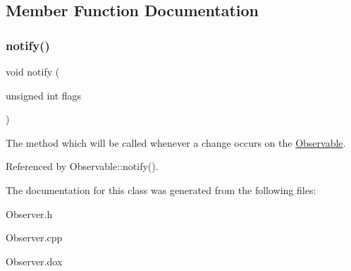\subsection{Member Function Documentation}
\mbox{\label{classKatabatic_1_1BaseObserver_a52e577fb0c4f2e3650928334fb621c2f}} 
\subsubsection{\texorpdfstring{notify()}{notify()}}
{\footnotesize\ttfamily void notify (\begin{DoxyParamCaption}\item[{unsigned int}]{flags }\end{DoxyParamCaption})\hspace{0.3cm}{\ttfamily [virtual]}}

The method which will be called whenever a change occurs on the \mbox{\hyperlink{classKatabatic_1_1Observable}{Observable}}. 

Referenced by Observable\+::notify().



The documentation for this class was generated from the following files\+:\begin{DoxyCompactItemize}
\item 
Observer.\+h\item 
Observer.\+cpp\item 
Observer.\+dox\end{DoxyCompactItemize}
